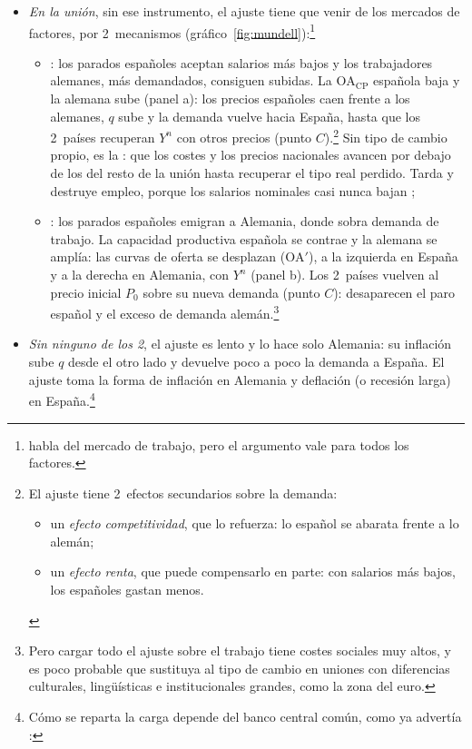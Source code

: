 \documentclass[11pt]{article}
\begin{document}
\begin{itemize}
\item \emph{En la unión}, sin ese instrumento, el ajuste tiene que venir de los mercados de factores, por 2~mecanismos (gráfico~\ref{fig:mundell}):\footnote{ habla del mercado de trabajo, pero el argumento vale para todos los factores.}
  \begin{itemize}
  \item {}: los parados españoles aceptan salarios más bajos y los trabajadores alemanes, más demandados, consiguen subidas. La $\mathrm{OA}_{\mathrm{CP}}$ española baja y la alemana sube (panel a): los precios españoles caen frente a los alemanes, $q$ sube y la demanda vuelve hacia España, hasta que los 2~países recuperan $Y^n$ con otros precios (punto $C$).\footnote{El ajuste tiene 2~efectos secundarios sobre la demanda:
\begin{itemize}
\item un \emph{efecto competitividad}, que lo refuerza: lo español se abarata frente a lo alemán;
\item un \emph{efecto renta}, que puede compensarlo en parte: con salarios más bajos, los españoles gastan menos.
\end{itemize}} Sin tipo de cambio propio, es la : que los costes y los precios nacionales avancen por debajo de los del resto de la unión hasta recuperar el tipo real perdido. Tarda y destruye empleo, porque los salarios nominales casi nunca bajan\nocite{SchmittGroheUribe2016Downward}  ;
  \item {}: los parados españoles emigran a Alemania, donde sobra demanda de trabajo. La capacidad productiva española se contrae y la alemana se amplía: las curvas de oferta se desplazan ($\mathrm{OA}'$), a la izquierda en España y a la derecha en Alemania, con $Y^n$ (panel b). Los 2~países vuelven al precio inicial $P_0$ sobre su nueva demanda (punto $C$): desaparecen el paro español y el exceso de demanda alemán.\footnote{Pero cargar todo el ajuste sobre el trabajo tiene costes sociales muy altos, y es poco probable que sustituya al tipo de cambio en uniones con diferencias culturales, lingüísticas e institucionales grandes, como la zona del euro.}
  \end{itemize}
\item \emph{Sin ninguno de los 2}, el ajuste es lento y lo hace solo Alemania: su inflación sube $q$ desde el otro lado y devuelve poco a poco la demanda a España. El ajuste toma la forma de inflación en Alemania y deflación (o recesión larga) en España.\footnote{Cómo se reparta la carga depende del banco central común, como ya advertía \textcite[658-659]{Mundell1961Theory}:
}
\end{itemize}
\end{document}
